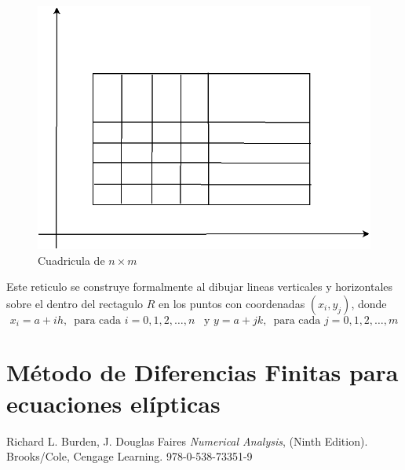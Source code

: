\documentclass[a4paper]{article}
\begin{document}
\begin{figure}[h]
\begin{center}
\includegraphics[scale=0.29]{./lattice.png} 
\end{center} 
\caption{Cuadricula de $n\times m$}
\label{fig::fig1}
\end{figure}
Este reticulo se construye formalmente al dibujar lineas verticales y horizontales sobre el dentro del rectagulo $R$ en los puntos con coordenadas $(x_i, y_j)$, donde
\begin{equation}
x_i=a+ih,\,\,\,\text{para cada }i=0,1,2,\hdots,n\,\,\, \text{ y } y=a+jk,\,\,\,\text{para cada }j=0,1,2,\hdots,m
\end{equation}


\section{Método de Diferencias Finitas para ecuaciones elípticas}



\begin{thebibliography}{99}


 Richard L. Burden, J. Douglas Faires \textit{Numerical Analysis}, (Ninth Edition). Brooks/Cole, Cengage Learning. 978-0-538-73351-9






\end{thebibliography}
\end{document}
